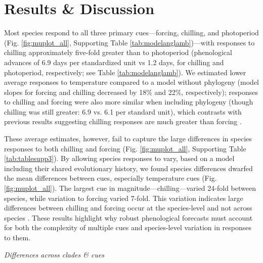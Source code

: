 \documentclass[11pt]{article}
\begin{document}
\section*{Results \& Discussion}
Most species respond to all three primary cues---forcing, chilling, and photoperiod (Fig. \ref{fig:muplot_all}, Supporting Table \ref{tab:modelanglamb})---with responses to chilling approximately five-fold greater than to photoperiod (phenological advances of 6.9 days per standardized unit vs 1.2 days, for chilling and photoperiod, respectively; see Table \ref{tab:modelanglamb}). We estimated lower average responses to temperature compared to a model without phylogeny (model slopes for forcing and chilling decreased by 18\% and 22\%, respectively); responses to chilling and forcing were also more similar when including phylogeny (though chilling was still greater: 6.9 vs. 6.1 per standard unit), which contrasts with previous results suggesting chilling responses are much greater than forcing  \citep{Laube:2014a,ettinger2020}. 

These average estimates, however, fail to capture the large differences in species responses to both chilling and forcing (Fig. \ref{fig:muplot_all}, Supporting Table \ref{tab:tablesupp3}). By allowing species responses to vary, based on a model including their shared evolutionary history, we found species differences dwarfed the mean differences between cues, especially temperature cues (Fig. \ref{fig:muplot_all}). The largest cue in magnitude---chilling---varied 24-fold between species, while variation to forcing varied 7-fold. This variation indicates large differences between chilling and forcing occur at the species-level and not across species \citep[as previously suggested,][]{Laube:2014a,ettinger2020}. These results highlight why robust phenological forecasts must account for both the complexity of multiple cues and species-level variation in responses to them.

\emph{Differences across clades \& cues}
\end{document}
